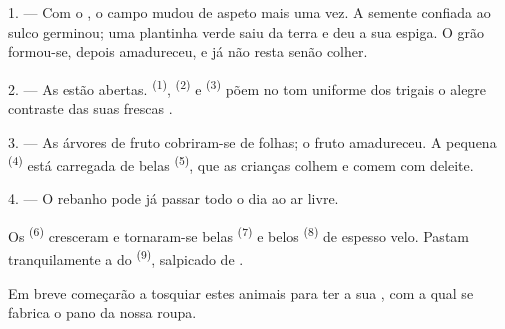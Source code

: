 %


\VUsaut{5.0mm}
\VUsaut{3.0mm}
\VUsaut{3.0mm}
\VUsaut{4.0mm}
\VUsaut{3.0mm}

1. --- Com o , o campo mudou de aspeto mais uma vez. A
semente confiada ao sulco germinou; uma plantinha verde saiu da terra e
deu a sua espiga. O grão formou-se, depois amadureceu, e já não resta
senão colher.

2. --- As  estão abertas. 
\textsuperscript{(1)},  \textsuperscript{(2)} e 
\textsuperscript{(3)} põem no tom uniforme dos trigais o alegre contraste das
suas frescas .

3. --- As árvores de fruto cobriram-se de folhas; o fruto amadureceu. A
pequena  \textsuperscript{(4)} está carregada de belas
 \textsuperscript{(5)}, que as crianças colhem e comem com
deleite.

4. --- O rebanho pode já passar todo o dia ao ar livre.

Os  \textsuperscript{(6)} cresceram e tornaram-se belas
 \textsuperscript{(7)} e belos 
\textsuperscript{(8)} de espesso velo. Pastam tranquilamente a  do
 \textsuperscript{(9)}, salpicado de .

Em breve começarão a tosquiar estes animais para ter a sua ,
com a qual se fabrica o pano da nossa roupa.

